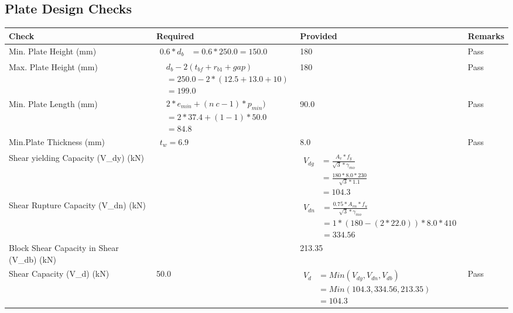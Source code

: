 \documentclass{article}%
\begin{document}
\subsection{Plate Design Checks}%
\label{subsec:PlateDesignChecks}%
\renewcommand{\arraystretch}{1.2}%
\begin{longtable}{|p{4cm}|p{5cm}|p{5.5cm}|p{1.5cm}|}%
\hline%
\rowcolor{OsdagGreen}%
Check&Required&Provided&Remarks\\%
\hline%
\endhead%
\hline%
Min. Plate Height (mm)&$\begin{aligned}0.6 * d_b&= 0.6 * 250.0=150.0\end{aligned}$&180&Pass\\%
\hline%
Max. Plate Height (mm)&$\begin{aligned} &d_b - 2 (t_{bf} + r_{b1} + gap)\\ &=250.0- 2* (12.5+13.0+ 10)\\ &=199.0\end{aligned}$&180&Pass\\%
\hline%
Min. Plate Length (mm)&$\begin{aligned} &2*e_{min} + (n~c-1) * p_{min})\\ &=2*37.4+(1-1) * 50.0\\ &=84.8\end{aligned}$&90.0&Pass\\%
\hline%
Min.Plate Thickness (mm)&$\begin{aligned} t_w=6.9\end{aligned}$&8.0&Pass\\%
\hline%
Shear yielding Capacity (V\_dy) (kN)&&$\begin{aligned} V_{dg} &= \frac{A_v*f_y}{\sqrt{3}*\gamma_{mo}}\\ &=\frac{180*8.0*230}{\sqrt{3}*1.1}\\ &=104.3\end{aligned}$&\\%
\hline%
Shear Rupture Capacity (V\_dn) (kN)&&$\begin{aligned} V_{dn} &= \frac{0.75*A_{vn}*f_u}{\sqrt{3}*\gamma_{mo}}\\ &=1*(180-(2*22.0))*8.0*410\\ &=334.56\end{aligned}$&\\%
\hline%
Block Shear Capacity in Shear (V\_db) (kN)&&213.35&\\%
\hline%
Shear Capacity (V\_d) (kN)&50.0&$\begin{aligned} V_d &= Min(V_{dy},V_{dn},V_{db})\\ &= Min(104.3,334.56,213.35)\\ &=104.3\end{aligned}$&Pass\\%

\end{longtable}
\end{document}
